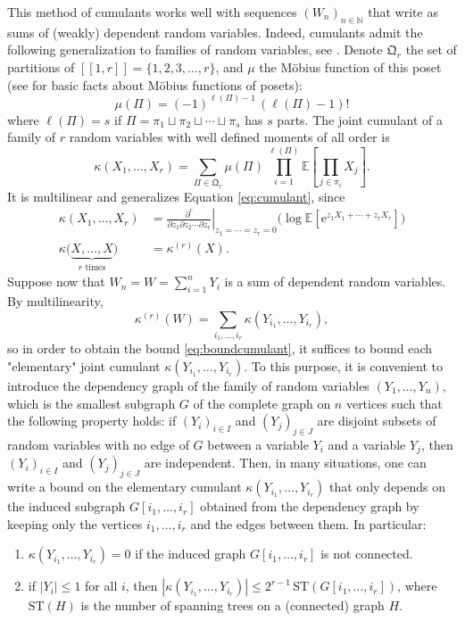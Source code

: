 \documentclass[12pt,a4paper,reqno]{amsart}
\newcommand{\N}{\mathbb{N}}
\newcommand{\E}{\mathrm{e}}
\newcommand{\esper}{\mathbb{E}}
\newcommand{\qym}{\mathfrak{Q}}
\newcommand{\lle}{\left[\!\left[}
\newcommand{\rre}{\right]\!\right]}
\theoremstyle{remark}
\begin{document}
This method of cumulants works well with sequences $(W_n)_{n \in \N}$ that write as sums of (weakly) dependent random variables. Indeed, cumulants admit the following generalization to families of random variables, see \cite{LS59}. Denote $\qym_r$ the set of partitions of $\lle 1,r\rre = \{1,2,3,\ldots,r\}$, and $\mu$ the M\"obius function of this poset (see \cite{Rot64} for basic facts about M\"obius functions of posets): 
$$\mu(\Pi)=(-1)^{\ell(\Pi)-1}\,(\ell(\Pi)-1)!$$
where $\ell(\Pi)=s$ if $\Pi=\pi_1 \sqcup \pi_2 \sqcup \cdots \sqcup \pi_s$ has $s$ parts. The joint cumulant of a family of $r$ random variables with well defined moments of all order is
$$\kappa(X_1,\ldots,X_r)=\sum_{\Pi \in \qym_r} \mu(\Pi)\,\prod_{i=1}^{\ell(\Pi)}\esper\!\left[\prod_{j \in \pi_i} X_j\right].$$
It is multilinear and generalizes Equation \eqref{eq:cumulant}, since
\begin{align*}
\kappa(X_1,\ldots,X_r)&=\left.\frac{\partial^r}{\partial z_1 \partial z_2 \cdots \partial z_r}\right|_{z_1=\cdots=z_r=0}\big(\log \esper[\E^{z_1X_1+\cdots+z_rX_r}]\big)\\
\kappa\big(\underbrace{X,\ldots,X}_{r\text{ times}}\big)&=\kappa^{(r)}(X).
\end{align*}
Suppose now that $W_n=W=\sum_{i=1}^n Y_i$ is a sum of dependent random variables. By multilinearity,
\begin{equation}\kappa^{(r)}(W)=\sum_{i_1,\ldots,i_r} \kappa(Y_{i_1},\ldots,Y_{i_r}),\label{eq:multilinearity}
\end{equation}
so in order to obtain the bound \eqref{eq:boundcumulant}, it suffices to bound each "elementary" joint cumulant $\kappa(Y_{i_1},\ldots,Y_{i_r})$. To this purpose, it is convenient to introduce the dependency graph of the family of random variables $(Y_{1},\ldots,Y_{n})$, which is the smallest subgraph $G$ of the complete graph on $n$ vertices such that the following property holds: if $(Y_i)_{i \in I}$ and $(Y_j)_{j \in J}$ are disjoint subsets of random variables with no edge of $G$ between a variable $Y_i$ and a variable $Y_j$, then $(Y_i)_{i \in I}$ and $(Y_j)_{j \in J}$ are independent. Then, in many situations, one can write a bound on the elementary cumulant $\kappa(Y_{i_1},\ldots,Y_{i_r})$ that only depends on the induced subgraph $G[i_1,\ldots,i_r]$ obtained from the dependency graph by keeping only the vertices $i_1,\ldots,i_r$ and the edges between them. In particular:\vspace{2mm}
\begin{enumerate}
\item $\kappa(Y_{i_1},\ldots,Y_{i_r})=0$ if the induced graph $G[i_1,\ldots,i_r]$  is not connected.
 \vspace{2mm}
\item if $|Y_i| \leq 1$ for all $i$, then $|\kappa(Y_{i_1},\ldots,Y_{i_r})| \leq 2^{r-1}\,\mathrm{ST}(G[i_1,\ldots,i_r])$, where $\mathrm{ST}(H)$ is the number of spanning trees on a (connected) graph $H$. \vspace{1mm}
\end{enumerate}
\end{document}
